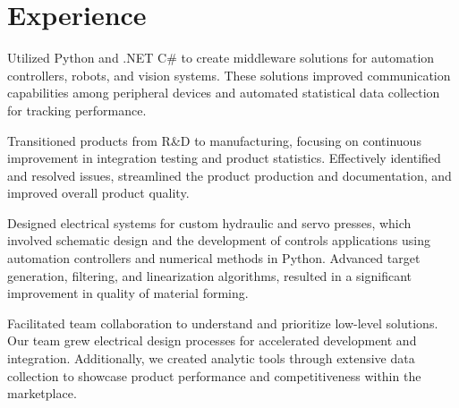 \documentclass{TTurner}
\begin{document}

\begin{minipage}[t]{0.75\textwidth} 

\section{Experience}
\vspace{\topsep}
\begin{tightemize}
\sectionsep
\item Utilized Python and .NET C\# to create middleware solutions for automation controllers, robots, and vision systems. These solutions improved communication capabilities among peripheral devices and automated statistical data collection for tracking performance.
\item Transitioned products from R\&D to manufacturing, focusing on continuous improvement in integration testing and product statistics. Effectively identified and resolved issues, streamlined the product production and documentation, and improved overall product quality. 
\end{tightemize}
\sectionsep

\begin{tightemize}
\sectionsep
\item Designed electrical systems for custom hydraulic and servo presses, which involved schematic design and the development of controls applications using automation controllers and numerical methods in Python. Advanced target generation, filtering, and linearization algorithms, resulted in a significant improvement in quality of material forming.
\item Facilitated team collaboration to understand and prioritize low-level solutions. Our team grew electrical design processes for accelerated development and integration. Additionally, we created analytic tools through extensive data collection to showcase product performance and competitiveness within the marketplace. 
\end{tightemize}
\sectionsep


\end{minipage}
\end{document}
